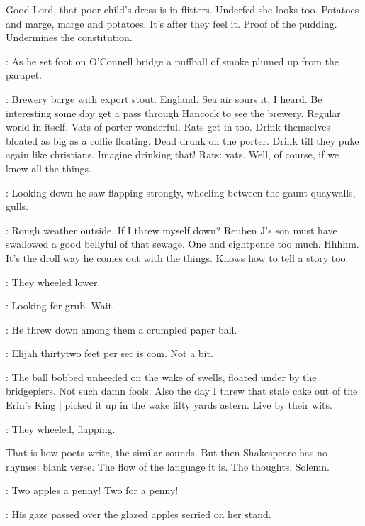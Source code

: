 Good Lord, that poor child's dress is in flitters.
Underfed she looks too.
Potatoes and marge,
marge and potatoes.
It's after they feel it.
Proof of the pudding.
Undermines the constitution.

:
As he set foot on O'Connell bridge
a puffball of smoke plumed up from the parapet.

\BloomInt:
Brewery barge with export stout.
England.
Sea air sours it, I heard.
Be interesting some day get a pass through Hancock to see the brewery.
Regular world in itself.
Vats of porter wonderful.
Rats get in too.
Drink themselves bloated as big as a collie floating.
Dead drunk on the porter.
Drink till they puke again like christians.
Imagine drinking that!
Rats: vats.
Well, of course,
if we knew all the things.

:
Looking down
he saw flapping strongly,
wheeling between the gaunt quaywalls,
gulls.

\BloomInt:
Rough weather outside.
If I threw myself down?
Reuben J's son must have swallowed a good bellyful of that sewage.
One and eightpence too much.
Hhhhm.
It's the droll way he comes out with the things.
Knows how to tell a story too.

:
They wheeled lower.

\BloomInt:
Looking for grub.
Wait.

:
He threw down among them a crumpled paper ball.

\BloomInt:
Elijah thirtytwo feet per sec is com.
Not a bit.

:
The ball bobbed unheeded on the wake of swells,
floated under by the bridgepiers.
Not such damn fools.
Also the day I threw that stale cake out of the Erin's King |
picked it up in the wake fifty yards astern.
Live by their wits.

:
They wheeled,
flapping.


That is how poets write, the similar sounds.
But then Shakespeare has no rhymes:
blank verse.
The flow of the language it is.
The thoughts.
Solemn.


\woman:
Two apples a penny!
Two for a penny!

:
His gaze passed over the glazed apples
serried on her stand.

